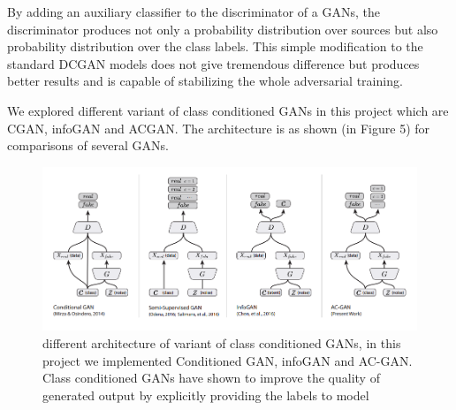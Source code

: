 \documentclass{article}
\begin{document}
By adding an auxiliary classifier to the discriminator of a GANs, the discriminator produces not only a probability distribution over sources but also probability distribution over the class labels. This simple modification to the standard DCGAN models does not give tremendous difference but produces better results and is capable of stabilizing the whole adversarial training.

We explored different variant of class conditioned GANs in this project which are CGAN, infoGAN and ACGAN.
The architecture is as shown (in Figure 5) for comparisons of several GANs.

\begin{figure}[h]
    \centering
    \includegraphics[width=1\textwidth]{images/class_conditional_gan.png}
    \caption{different architecture of variant of class conditioned GANs, in this project we implemented Conditioned GAN, infoGAN and AC-GAN. Class conditioned GANs have shown to improve the quality of generated output by explicitly providing the labels to model}
    \label{fig:mesh1}
\end{figure}
\medskip

\medskip
\end{document}

